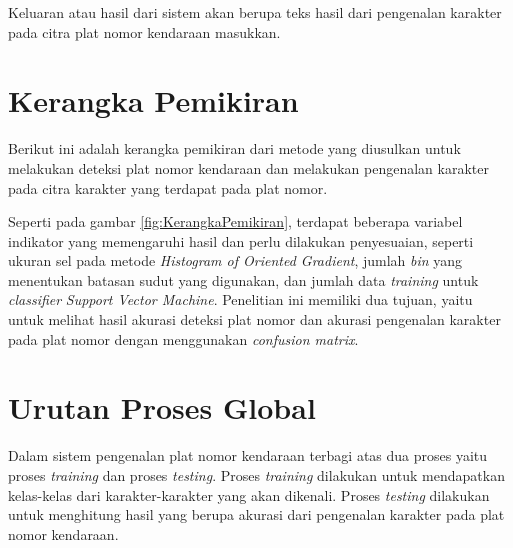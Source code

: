 \noindent Keluaran atau hasil dari sistem akan berupa teks hasil dari pengenalan karakter pada citra plat nomor kendaraan masukkan.\\ 

\section{Kerangka Pemikiran}
\noindent Berikut ini adalah kerangka pemikiran dari metode yang diusulkan untuk melakukan deteksi plat nomor kendaraan dan melakukan pengenalan karakter pada citra karakter yang terdapat pada plat nomor.\\

\begin{adjustbox}{width=1\textwidth}
	\noindent\begin{minipage}{\linewidth}
	\label{fig:KerangkaPemikiran}
\end{minipage}
\end{adjustbox}

\noindent Seperti pada gambar \ref{fig:KerangkaPemikiran}, terdapat beberapa variabel indikator yang memengaruhi hasil dan perlu dilakukan penyesuaian, seperti ukuran sel pada metode \textit{Histogram of Oriented Gradient}, jumlah \textit{bin} yang menentukan batasan sudut yang digunakan, dan jumlah data \textit{training} untuk \textit{classifier} \textit{Support Vector Machine}. Penelitian ini memiliki dua tujuan, yaitu untuk melihat hasil akurasi deteksi plat nomor dan akurasi pengenalan karakter pada plat nomor dengan menggunakan \textit{confusion matrix}.\\

\section{Urutan Proses Global}
\noindent Dalam sistem pengenalan plat nomor kendaraan terbagi atas dua proses yaitu proses \textit{training} dan proses \textit{testing}. Proses \textit{training} dilakukan untuk mendapatkan kelas-kelas dari karakter-karakter yang akan dikenali. Proses \textit{testing} dilakukan untuk menghitung hasil yang berupa akurasi dari pengenalan karakter pada plat nomor kendaraan.\\

